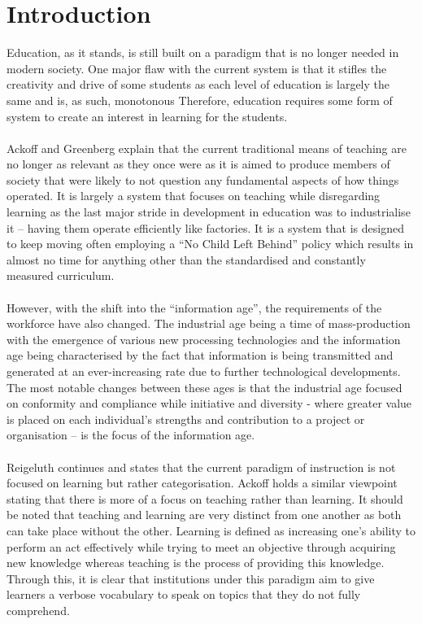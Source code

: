 \documentclass[conference]{IEEEtran}
\begin{document}
\section{Introduction}
Education, as it stands, is still built on a paradigm that is no longer needed in modern society. One major flaw with the current system is that it stifles the creativity and drive of some students as each level of education is largely the same and is, as such, monotonous\cite{Ackoff2008} Therefore, education requires some form of system to create an interest in learning for the students.
\\\\
Ackoff and Greenberg\cite{Ackoff2008} explain that the current traditional means of teaching are no longer as relevant as they once were as it is aimed to produce members of society that were likely to not question any fundamental aspects of how things operated. It is largely a system that focuses on teaching while disregarding learning as the last major stride in development in education was to industrialise it – having them operate efficiently like factories\cite{Ackoff2008}. It is a system that is designed to keep moving often employing a “No Child Left Behind” policy which results in almost no time for anything other than the standardised and constantly measured curriculum\cite{gibson2006games}. 
\\\\
However, with the shift into the “information age”, the requirements of the workforce have also changed. The industrial age being a time of mass-production with the emergence of various new processing technologies and the information age being characterised by the fact that information is being transmitted and generated at an ever-increasing rate due to further technological developments\cite{gibson2006games, Reigeluth1996}. The most notable changes between these ages is that the industrial age focused on conformity and compliance while initiative and diversity - where greater value is placed on each individual’s strengths and contribution to a project or organisation – is the focus of the information age\cite{Reigeluth1996}.  
\\\\
Reigeluth\cite{Reigeluth1996} continues and states that the current paradigm of instruction is not focused on learning but rather categorisation. Ackoff\cite{Ackoff1991} holds a similar viewpoint stating that there is more of a focus on teaching rather than learning. It should be noted that teaching and learning are very distinct from one another as both can take place without the other\cite{Ackoff1991}. Learning is defined as increasing one’s ability to perform an act effectively while trying to meet an objective through acquiring new knowledge whereas teaching is the process of providing this knowledge\cite{Ackoff1991}. Through this, it is clear that institutions under this paradigm aim to give learners a verbose vocabulary to speak on topics that they do not fully comprehend\cite{Ackoff1991}. 
\end{document}
